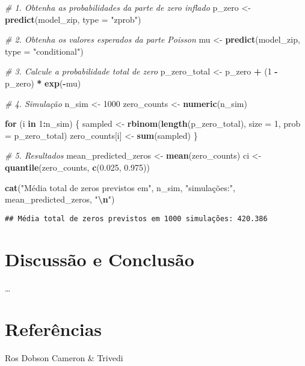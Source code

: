 \documentclass[
]{article}
\newenvironment{Shaded}{\begin{snugshade}}{\end{snugshade}}
\newcommand{\AttributeTok}[1]{\textcolor[rgb]{0.13,0.29,0.53}{#1}}
\newcommand{\CommentTok}[1]{\textcolor[rgb]{0.56,0.35,0.01}{\textit{#1}}}
\newcommand{\ControlFlowTok}[1]{\textcolor[rgb]{0.13,0.29,0.53}{\textbf{#1}}}
\newcommand{\DecValTok}[1]{\textcolor[rgb]{0.00,0.00,0.81}{#1}}
\newcommand{\FloatTok}[1]{\textcolor[rgb]{0.00,0.00,0.81}{#1}}
\newcommand{\FunctionTok}[1]{\textcolor[rgb]{0.13,0.29,0.53}{\textbf{#1}}}
\newcommand{\NormalTok}[1]{#1}
\newcommand{\OtherTok}[1]{\textcolor[rgb]{0.56,0.35,0.01}{#1}}
\newcommand{\SpecialCharTok}[1]{\textcolor[rgb]{0.81,0.36,0.00}{\textbf{#1}}}
\newcommand{\StringTok}[1]{\textcolor[rgb]{0.31,0.60,0.02}{#1}}
\begin{document}
\begin{Shaded}
\begin{Highlighting}[]
\CommentTok{\# 1. Obtenha as probabilidades da parte de zero inflado}
\NormalTok{p\_zero }\OtherTok{\textless{}{-}} \FunctionTok{predict}\NormalTok{(model\_zip, }\AttributeTok{type =} \StringTok{"zprob"}\NormalTok{)         }

\CommentTok{\# 2. Obtenha os valores esperados da parte Poisson}
\NormalTok{mu }\OtherTok{\textless{}{-}} \FunctionTok{predict}\NormalTok{(model\_zip, }\AttributeTok{type =} \StringTok{"conditional"}\NormalTok{)       }

\CommentTok{\# 3. Calcule a probabilidade total de zero}
\NormalTok{p\_zero\_total }\OtherTok{\textless{}{-}}\NormalTok{ p\_zero }\SpecialCharTok{+}\NormalTok{ (}\DecValTok{1} \SpecialCharTok{{-}}\NormalTok{ p\_zero) }\SpecialCharTok{*} \FunctionTok{exp}\NormalTok{(}\SpecialCharTok{{-}}\NormalTok{mu)}

\CommentTok{\# 4. Simulação}
\NormalTok{n\_sim }\OtherTok{\textless{}{-}} \DecValTok{1000}
\NormalTok{zero\_counts }\OtherTok{\textless{}{-}} \FunctionTok{numeric}\NormalTok{(n\_sim)}

\ControlFlowTok{for}\NormalTok{ (i }\ControlFlowTok{in} \DecValTok{1}\SpecialCharTok{:}\NormalTok{n\_sim) \{}
\NormalTok{  sampled }\OtherTok{\textless{}{-}} \FunctionTok{rbinom}\NormalTok{(}\FunctionTok{length}\NormalTok{(p\_zero\_total), }\AttributeTok{size =} \DecValTok{1}\NormalTok{, }\AttributeTok{prob =}\NormalTok{ p\_zero\_total)}
\NormalTok{  zero\_counts[i] }\OtherTok{\textless{}{-}} \FunctionTok{sum}\NormalTok{(sampled)}
\NormalTok{\}}

\CommentTok{\# 5. Resultados}
\NormalTok{mean\_predicted\_zeros }\OtherTok{\textless{}{-}} \FunctionTok{mean}\NormalTok{(zero\_counts)}
\NormalTok{ci }\OtherTok{\textless{}{-}} \FunctionTok{quantile}\NormalTok{(zero\_counts, }\FunctionTok{c}\NormalTok{(}\FloatTok{0.025}\NormalTok{, }\FloatTok{0.975}\NormalTok{))}

\FunctionTok{cat}\NormalTok{(}\StringTok{"Média total de zeros previstos em"}\NormalTok{, n\_sim, }\StringTok{"simulações:"}\NormalTok{, mean\_predicted\_zeros, }\StringTok{"}\SpecialCharTok{\textbackslash{}n}\StringTok{"}\NormalTok{)}
\end{Highlighting}
\end{Shaded}

\begin{verbatim}
## Média total de zeros previstos em 1000 simulações: 420.386
\end{verbatim}

\section{Discussão e Conclusão}\label{discussuxe3o-e-conclusuxe3o}

\ldots{}

\section{Referências}\label{referuxeancias}

Ros Dobson Cameron \& Trivedi
\end{document}
